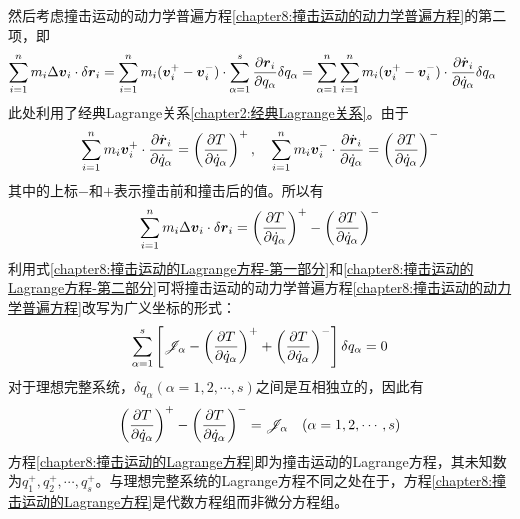 然后考虑撞击运动的动力学普遍方程\eqref{chapter8:撞击运动的动力学普遍方程}的第二项，即
\begin{align*}
	\sum_{i=1}^n m_i\Delta\boldsymbol{v}_i \cdot\delta\boldsymbol{r}_i & = \sum_{i=1}^n m_i(\boldsymbol{v}_i^+-\boldsymbol{v}_i^-) \cdot \sum_{\alpha=1}^s \frac{\partial \boldsymbol{r}_i}{\partial q_\alpha} \delta q_\alpha = \sum_{\alpha=1}^n \sum_{i=1}^n m_i (\boldsymbol{v}_i^+ -\boldsymbol{v}_i^-) \cdot \frac{\partial \dot{\boldsymbol{r}}_i}{\partial \dot{q}_\alpha} \delta q_\alpha
\end{align*}
此处利用了经典Lagrange关系\eqref{chapter2:经典Lagrange关系}。由于
\begin{equation}
	\sum_{i=1}^n m_i\boldsymbol{v}_i^+ \cdot \frac{\partial \dot{\boldsymbol{r}}_i}{\partial \dot{q}_\alpha} = \left(\frac{\partial T}{\partial \dot{q}_\alpha}\right)^+,\quad \sum_{i=1}^n m_i\boldsymbol{v}_i^- \cdot \frac{\partial \dot{\boldsymbol{r}}_i}{\partial \dot{q}_\alpha} = \left(\frac{\partial T}{\partial \dot{q}_\alpha}\right)^-
\end{equation}
其中的上标$-$和$+$表示撞击前和撞击后的值。所以有
\begin{equation}
	\sum_{i=1}^n m_i\Delta\boldsymbol{v}_i \cdot\delta\boldsymbol{r}_i = \left(\frac{\partial T}{\partial \dot{q}_\alpha}\right)^+ - \left(\frac{\partial T}{\partial \dot{q}_\alpha}\right)^-
	\label{chapter8:撞击运动的Lagrange方程-第二部分}
\end{equation}
利用式\eqref{chapter8:撞击运动的Lagrange方程-第一部分}和\eqref{chapter8:撞击运动的Lagrange方程-第二部分}可将撞击运动的动力学普遍方程\eqref{chapter8:撞击运动的动力学普遍方程}改写为广义坐标的形式：
\begin{equation}
	\sum_{\alpha=1}^s \left[\mathscr{J}_\alpha - \left(\frac{\partial T}{\partial \dot{q}_\alpha}\right)^+ + \left(\frac{\partial T}{\partial \dot{q}_\alpha}\right)^-\right]\delta q_\alpha = 0
\end{equation}
对于理想完整系统，$\delta q_\alpha(\alpha=1,2,\cdots,s)$之间是互相独立的，因此有
\begin{equation}
	\left(\frac{\partial T}{\partial \dot{q}_\alpha}\right)^+ - \left(\frac{\partial T}{\partial \dot{q}_\alpha}\right)^- = \mathscr{J}_\alpha \quad (\alpha=1,2,\cdots,s)
	\label{chapter8:撞击运动的Lagrange方程}
\end{equation}
方程\eqref{chapter8:撞击运动的Lagrange方程}即为撞击运动的Lagrange方程，其未知数为$q_1^+,q_2^+,\cdots,q_s^+$。与理想完整系统的Lagrange方程不同之处在于，方程\eqref{chapter8:撞击运动的Lagrange方程}是代数方程组而非微分方程组。

